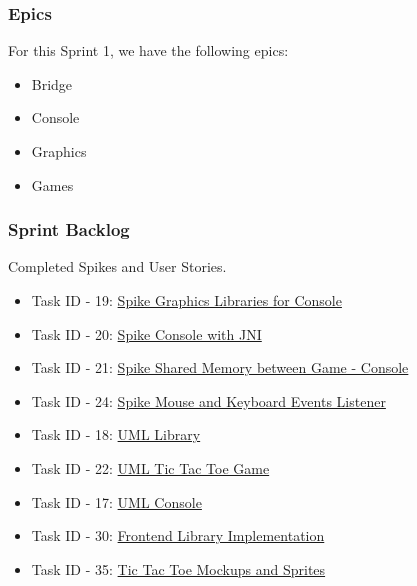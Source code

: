 \newpage

\subsubsection{Epics}

For this Sprint 1, we have the following epics:

\begin{itemize}
    \item Bridge
    \item Console
    \item Graphics
    \item Games
\end{itemize}

\subsubsection{Sprint Backlog}

Completed Spikes and User Stories.

\begin{itemize}
    \item Task ID - 19: \href{https://tree.taiga.io/project/joseluis-teran-coffeetime/us/19?milestone=392128}{Spike Graphics Libraries for Console}
    \item Task ID - 20: \href{https://tree.taiga.io/project/joseluis-teran-coffeetime/us/20?milestone=392128}{Spike Console with JNI}
    \item Task ID - 21: \href{https://tree.taiga.io/project/joseluis-teran-coffeetime/us/21?milestone=392128}{Spike Shared Memory between Game - Console}
    \item Task ID - 24: \href{https://tree.taiga.io/project/joseluis-teran-coffeetime/us/24?milestone=392128}{Spike Mouse and Keyboard Events Listener}
    \item Task ID - 18: \href{https://tree.taiga.io/project/joseluis-teran-coffeetime/us/18?milestone=392128}{UML Library}
    \item Task ID - 22: \href{https://tree.taiga.io/project/joseluis-teran-coffeetime/us/22?milestone=392128}{UML Tic Tac Toe Game}
    \item Task ID - 17: \href{https://tree.taiga.io/project/joseluis-teran-coffeetime/us/17?milestone=392128}{UML Console}
    \item Task ID - 30: \href{https://tree.taiga.io/project/joseluis-teran-coffeetime/us/30?milestone=392128}{Frontend Library Implementation}
    \item Task ID - 35: \href{https://tree.taiga.io/project/joseluis-teran-coffeetime/us/35?milestone=392128}{Tic Tac Toe Mockups and Sprites}    
\end{itemize}

